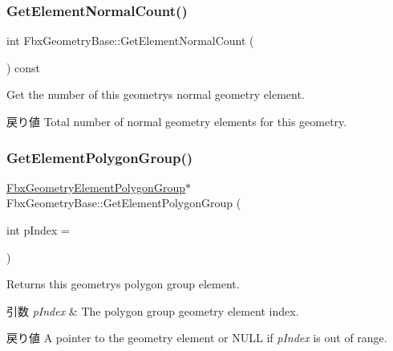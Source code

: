 \subsubsection{\texorpdfstring{Get\+Element\+Normal\+Count()}{GetElementNormalCount()}}
{\footnotesize\ttfamily int Fbx\+Geometry\+Base\+::\+Get\+Element\+Normal\+Count (\begin{DoxyParamCaption}{ }\end{DoxyParamCaption}) const}

Get the number of this geometry\textquotesingle{}s normal geometry element. \begin{DoxyReturn}{戻り値}
Total number of normal geometry elements for this geometry. 
\end{DoxyReturn}
\mbox{\label{class_fbx_geometry_base_ae54cbd4165026b82500d776a21e81e32}} 
\subsubsection{\texorpdfstring{Get\+Element\+Polygon\+Group()}{GetElementPolygonGroup()}\hspace{0.1cm}{\footnotesize\ttfamily [1/2]}}
{\footnotesize\ttfamily \hyperlink{fbxlayer_8h_aa5c7fb92a1c396014bf2ced7797a95a9}{Fbx\+Geometry\+Element\+Polygon\+Group}$\ast$ Fbx\+Geometry\+Base\+::\+Get\+Element\+Polygon\+Group (\begin{DoxyParamCaption}\item[{int}]{p\+Index = {} }\end{DoxyParamCaption})}

Returns this geometry\textquotesingle{}s polygon group element. 
\begin{DoxyParams}{引数}
{\em p\+Index} & The polygon group geometry element index. \\
\hline
\end{DoxyParams}
\begin{DoxyReturn}{戻り値}
A pointer to the geometry element or {\ttfamily N\+U\+LL} if {\itshape p\+Index} is out of range. 
\end{DoxyReturn}
\mbox{\label{class_fbx_geometry_base_a11838aa5259cb37a3024a9eb654b705c}} 
